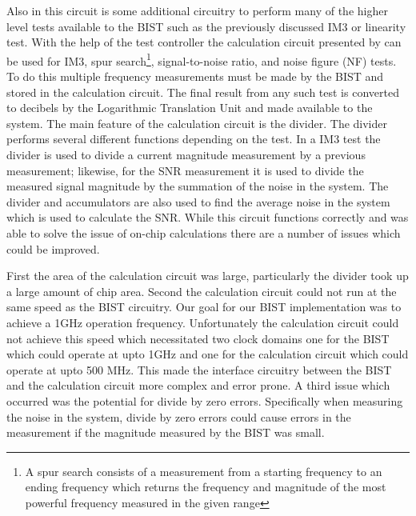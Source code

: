\documentclass[12pt]{report}
\begin{document}
Also in this circuit is some additional circuitry to perform many of the higher level tests available to the BIST such as the previously discussed IM3 or linearity test.  With the help of the test controller the calculation circuit presented by \cite{joey} can be used for IM3, spur search\footnote{A spur search consists of a measurement from a starting frequency to an ending frequency which returns the frequency and magnitude of the most powerful frequency measured in the given range}, signal-to-noise ratio, and noise figure (NF) tests.  To do this multiple frequency measurements must be made by the BIST and stored in the calculation circuit.  The final result from any such test is converted to decibels by the Logarithmic Translation Unit and made available to the system.  The main feature of the calculation circuit is the divider.  The divider performs several different functions depending on the test.  In a IM3 test the divider is used to divide a current magnitude measurement by a previous measurement; likewise, for the SNR measurement it is used to divide the measured signal magnitude by the summation of the noise in the system\cite{joey}.  The divider and accumulators are also used to find the average noise in the system which is used to calculate the SNR.  While this circuit functions correctly and was able to solve the issue of on-chip calculations there are a number of issues which could be improved.

First the area of the calculation circuit was large, particularly the divider took up a large amount of chip area.  Second the calculation circuit could not run at the same speed as the BIST circuitry.  Our goal for our BIST implementation was to achieve a 1GHz operation frequency.  Unfortunately the calculation circuit could not achieve this speed which necessitated two clock domains one for the BIST which could operate at upto 1GHz and one for the calculation circuit which could operate at upto 500 MHz.  This made the interface circuitry between the BIST and the calculation circuit more complex and error prone.  A third issue which occurred was the potential for divide by zero errors.  Specifically when measuring the noise in the system, divide by zero errors could cause errors in the measurement if the magnitude measured by the BIST was small.
\end{document}
